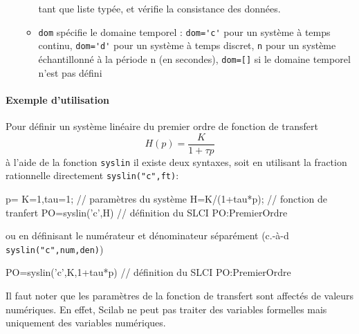 \begin{doc}
\begin{itemize}
\begin{itemize}
                      tant que liste typée, et vérifie la consistance des 
                      données.
                \item \verb?dom? spécifie le domaine temporel :
                      \verb?dom='c'? pour un système à temps continu, 
                      \verb?dom='d'? pour un système à temps discret, 
                      \verb?n? pour un système échantillonné à la période n 
                      (en secondes), 
                      \verb?dom=[]? si le domaine temporel n'est pas défini
            \end{itemize}
    \end{itemize}
\end{doc}
\paragraph{Exemple d'utilisation}
Pour définir un système linéaire du premier ordre de fonction de transfert
\[
H(p)=\dfrac{K}{1+\tau p}
\]
à l'aide de la fonction \verb?syslin? il existe deux syntaxes, soit en 
utilisant la fraction rationnelle directement \verb?syslin("c",ft)?:
\begin{Scilabcode}
p=%
K=1,tau=1;             // paramètres du système
H=K/(1+tau*p);         // fonction de tranfert
PO=syslin('c',H)       // définition du SLCI PO:PremierOrdre
\end{Scilabcode}
ou en définisant le numérateur et dénominateur séparément 
(c.-à-d \verb?syslin("c",num,den)?)
\begin{Scilabcode}
PO=syslin('c',K,1+tau*p)  // définition du SLCI PO:PremierOrdre
\end{Scilabcode}
Il faut noter que les paramètres de la fonction de transfert sont affectés 
de valeurs numériques. En effet, Scilab ne peut pas traiter des variables 
formelles mais uniquement des variables \og numériques\fg.
